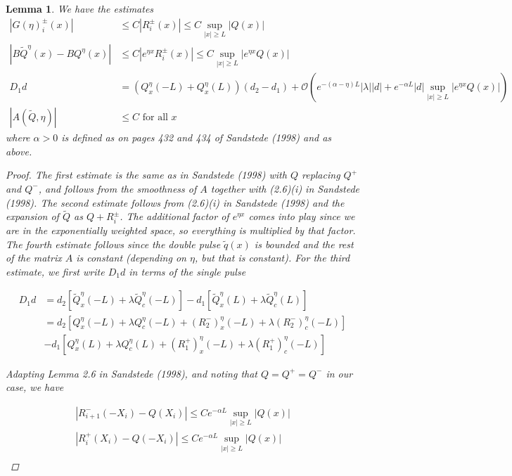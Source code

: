 \documentclass[12pt]{article}
\newtheorem{lemma}{Lemma}
\begin{document}
\begin{lemma}\label{estimates}
We have the estimates
\begin{align*}
|G(\eta)_i^\pm(x)| &\leq C|R_i^\pm(x)| \leq C \sup_{|x| \geq L} |Q(x)| \\
| B \tilde{Q}^\eta(x) - B Q^\eta(x) | & \leq C | e^{\eta x} R_i^\pm(x)| \leq C \sup_{|x| \geq L} |e^{\eta x} Q(x)| \\
D_1 d &= (Q^\eta_x(-L) + Q^\eta_x(L))(d_2 - d_1) + \mathcal{O}\left(e^{-(\alpha - \eta) L}|\lambda||d| + e^{-\alpha L} |d| \sup_{|x| \geq L} |e^{\eta x} Q(x)| \right) \\
|A(\tilde{Q}, \eta)| &\leq C \textrm{ for all }x
\end{align*}
where $\alpha > 0$ is defined as on pages 432 and 434 of Sandstede (1998) and as above.

\begin{proof}
The first estimate is the same as in Sandstede (1998) with $Q$ replacing $Q^+$ and $Q^-$, and follows from the smoothness of $A$ together with (2.6)(i) in Sandstede (1998). The second estimate follows from (2.6)(i) in Sandstede (1998) and the expansion of $\tilde{Q}$ as $Q + R_i^\pm$. The additional factor of $e^{\eta x}$ comes into play since we are in the exponentially weighted space, so everything is multiplied by that factor. The fourth estimate follows since the double pulse $\tilde{q}(x)$ is bounded and the rest of the matrix $A$ is constant (depending on $\eta$, but that is constant). For the third estimate, we first write $D_1 d$ in terms of the single pulse

\begin{align*}
D_1 d &= d_2 [ \tilde{Q}^\eta_x(-L) + \lambda \tilde{Q}^\eta_c(-L)] 
- d_1 [ \tilde{Q}^\eta_x(L) + \lambda \tilde{Q}^\eta_c(L)] \\
&= d_2 [ Q^\eta_x(-L) + \lambda Q^\eta_c(-L) + (R_2^-)^\eta_x(-L) + \lambda (R_2^-)^\eta_c(-L)] \\
&- d_1 [ Q^\eta_x(L) + \lambda Q^\eta_c(L) + (R_1^+)^\eta_x(-L) + \lambda (R_1^+)^\eta_c(-L)] 
\end{align*}

Adapting Lemma 2.6 in Sandstede (1998), and noting that $Q = Q^+ = Q^-$ in our case, we have

\begin{align*}
|R_{i+1}^-(-X_i) - Q(X_i)| \leq C e^{-\alpha L} \sup_{|x| \geq L} |Q(x)| \\
|R_{i}^+(X_i) - Q(-X_i)| \leq C e^{-\alpha L} \sup_{|x| \geq L} |Q(x)| \\
\end{align*}


\end{proof}
\end{lemma}
\end{document}
